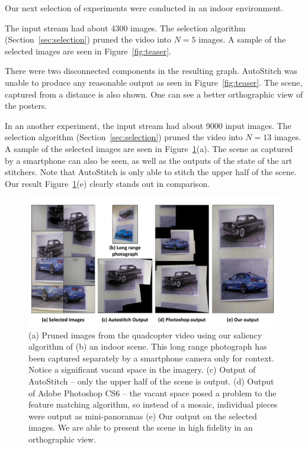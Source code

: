 Our next selection of experiments were conducted in an indoor
environment.  

The input stream had about 4300
images. The selection algorithm (Section~\ref{sec:selection}) pruned the video
into $N=5$ images. A sample of the selected images are seen in Figure~\ref{fig:teaser}.

There were two disconnected components in the resulting graph.
AutoStitch was unable to produce any reasonable output as seen in
Figure~\ref{fig:teaser}.  The scene, captured from a distance is also
shown.  One can see a better orthographic view of the posters.

In an another experiment, the input stream had about 9000 input
images.  The selection algorithm (Section~\ref{sec:selection}) pruned
the video into $N=13$ images. A sample of the selected images are seen
in Figure~\ref{fig:indoor_results}(a).  The scene as captured by a
smartphone can also be seen, as well as the outputs of the state of
the art stitchers. Note that AutoStitch is only able to stitch the
upper half of the scene.  Our result
Figure~\ref{fig:indoor_results}(e) clearly stands out in comparison.

\begin{figure}
\centering
\includegraphics[width=\linewidth]{figures/indoor_results}
\caption[Result: Cars]{ (a) Pruned images from the quadcopter video using our
  saliency algorithm of (b) an indoor scene. This long range photograph
  has been captured separately by a smartphone camera only for
  context. Notice a significant vacant space in the imagery.  (c)
  Output of AutoStitch -- only the upper half of the scene is output.
  (d) Output of Adobe Photoshop CS6 -- the vacant space posed a problem to the
  feature matching algorithm, so instead of a mosaic, individual
  pieces were output as mini-panoramas (e) Our output on the selected
  images. We are able to present the scene in high fidelity in an
  orthographic view.}
\label{fig:indoor_results}
\end{figure}

